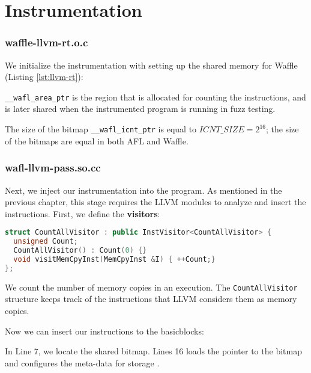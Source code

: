 \section{Instrumentation}
\label{sec:3-instr}

\subsubsection*{waffle-llvm-rt.o.c}

We initialize the instrumentation with setting up the shared memory for Waffle (Listing \ref{lst:llvm-rt}):



\texttt{\_\_wafl\_area\_ptr} is the region that is allocated for counting the instructions, and is later shared when the instrumented program is running in fuzz testing.

The size of the bitmap \texttt{\_\_wafl\_icnt\_ptr} is equal to $ICNT\_SIZE=2^{16}$; the size of the bitmaps are equal in both AFL and Waffle.

\subsubsection*{wafl-llvm-pass.so.cc}

Next, we inject our instrumentation into the program. As mentioned in the previous chapter, this stage requires the LLVM modules to analyze and insert the instructions. First, we define the \textbf{visitors}:

\begin{lstlisting}[language=C++,style=CodeStyle,label={lst:wfl-vis}]
struct CountAllVisitor : public InstVisitor<CountAllVisitor> {
  unsigned Count;
  CountAllVisitor() : Count(0) {}
  void visitMemCpyInst(MemCpyInst &I) { ++Count;}
};
\end{lstlisting}

We count the number of memory copies in an execution. The \texttt{CountAll\-Visitor} structure keeps track of the instructions that LLVM considers them as memory copies.

Now we can insert our instructions to the basicblocks:



In Line 7, we locate the shared bitmap. Lines 16 loads the pointer to the bitmap and configures the meta-data for storage \cite{nosanitize}.

